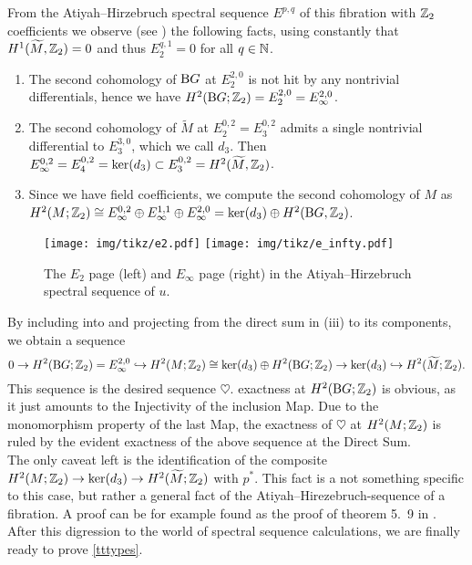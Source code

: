From the Atiyah--Hirzebruch spectral sequence $E^{p,q}$ of this fibration with $\mathbb{Z}_2$ coefficients we observe (see ) the following facts, using constantly that $H^1(\widetilde{M},\mathbb{Z}_2) = 0$ and thus $E_2^{q,1} = 0$ for all $q\in\mathbb{N}$.
\begin{enumerate}[label=(\roman*)]
    \item The second cohomology of $\mathrm{B} G$ at $E_2^{2,0}$ is not hit by any nontrivial differentials, hence we have $H^2 (\mathrm{B} G; \mathbb{Z}_2) = E_2^{2,0} = E_\infty^{2,0}$.
    \item The second cohomology of $\widetilde{M}$ at $E_2^{0,2} = E_3^{0,2}$ admits a single nontrivial differential to $E_3^{3,0}$, which we call $d_3$. Then $E_\infty^{0,2} = E_4^{0,2} = \ker(d_3) \subset E_3^{0,2} = H^2(\widetilde{M},\mathbb{Z}_2)$.
    \item Since we have field coefficients, we compute the second cohomology of $M$ as $H^2(M;\mathbb{Z}_2) \cong E_\infty^{0,2} \oplus E_\infty^{1,1}\oplus E_\infty^{2,0} = \ker(d_3) \oplus H^2(\mathrm{B} G,\mathbb{Z}_2)$.
\end{enumerate}
\begin{figure}
    \centering
    \texttt{[image: img/tikz/e2.pdf]}
    \texttt{[image: img/tikz/e\_infty.pdf]}
    \caption{The $E_2$ page (left) and $E_\infty$ page (right) in the Atiyah--Hirzebruch spectral sequence of $u$.}\label{fig:ahss}
\end{figure}
By including into and projecting from the direct sum in (iii) to its components, we obtain a sequence
\begin{equation*}
    0 \to H^2(\mathrm{B} G;\mathbb{Z}_2) = E_\infty^{2,0} \hookrightarrow H^2(M;\mathbb{Z}_2) \cong \ker(d_3) \oplus H^2(\mathrm{B} G;\mathbb{Z}_2) \to \ker(d_3) \hookrightarrow H^2(\widetilde{M};\mathbb{Z}_2).
\end{equation*}
This sequence is the desired sequence $\heartsuit$.
exactness at $H^2(\mathrm{B} G;\mathbb{Z}_2)$ is obvious, as it just amounts to the Injectivity of the inclusion Map.
Due to the monomorphism property of the last Map, the exactness of $\heartsuit$ at $H^2(M;\mathbb{Z}_2)$ is ruled by the evident exactness of the above sequence at the Direct Sum.\\
The only caveat left is the identification of the composite $H^2(M;\mathbb{Z}_2) \to \ker(d_3) \to H^2(\widetilde{M};\mathbb{Z}_2)$ with $p^\ast$.
This fact is a not something specific to this case, but rather a general fact of the Atiyah--Hirezebruch-sequence of a fibration.
A proof can be for example found as the proof of theorem 5.~9 in \cite{mc:guide}.
After this digression to the world of spectral sequence calculations, we are finally ready to prove \ref{tttypes}.\\
